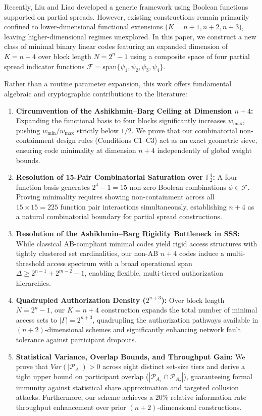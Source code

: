 \documentclass[pdflatex,sn-mathphys-num]{sn-jnl}%
\theoremstyle{thmstyleone}%
\theoremstyle{thmstyletwo}%
\theoremstyle{thmstylethree}%
\begin{document}
Recently, Liu and Liao \cite{LiuLiao2022} developed a generic framework using Boolean functions supported on partial spreads. However, existing constructions remain primarily confined to lower-dimensional functional extensions ($K = n+1, n+2, n+3$), leaving higher-dimensional regimes unexplored. In this paper, we construct a new class of minimal binary linear codes featuring an expanded dimension of $K = n + 4$ over block length $N = 2^n - 1$ using a composite space of four partial spread indicator functions $\mathcal{F} = \text{span}\{\psi_1, \psi_2, \psi_3, \psi_4\}$.

Rather than a routine parameter expansion, this work offers fundamental algebraic and cryptographic contributions to the literature:

\begin{enumerate}
    \item \textbf{Circumvention of the Ashikhmin--Barg Ceiling at Dimension $n+4$:} Expanding the functional basis to four blocks significantly increases $w_{\max}$, pushing $w_{\min}/w_{\max}$ strictly below $1/2$. We prove that our combinatorial non-containment design rules (Conditions C1--C3) act as an exact geometric sieve, ensuring code minimality at dimension $n+4$ independently of global weight bounds.

    \item \textbf{Resolution of 15-Pair Combinatorial Saturation over $\mathbb{F}_2^4$:} A four-function basis generates $2^4 - 1 = 15$ non-zero Boolean combinations $\phi \in \mathcal{F}$. Proving minimality requires showing non-containment across all $15 \times 15 = 225$ function pair interactions simultaneously, establishing $n + 4$ as a natural combinatorial boundary for partial spread constructions.

    \item \textbf{Resolution of the Ashikhmin--Barg Rigidity Bottleneck in SSS:} While classical AB-compliant minimal codes yield rigid access structures with tightly clustered set cardinalities, our non-AB $n+4$ codes induce a multi-threshold access spectrum with a broad operational span $\Delta \ge 2^{n-1} + 2^{m-2} - 1$, enabling flexible, multi-tiered authorization hierarchies.

    \item \textbf{Quadrupled Authorization Density ($2^{n+3}$):} Over block length $N = 2^n - 1$, our $K = n+4$ construction expands the total number of minimal access sets to $|\Gamma| = 2^{n+3}$, quadrupling the authorization pathways available in $(n+2)$-dimensional schemes \cite{LiuLiao2022} and significantly enhancing network fault tolerance against participant dropouts.

    \item \textbf{Statistical Variance, Overlap Bounds, and Throughput Gain:} We prove that $Var(|\mathcal{P}_A|) > 0$ across eight distinct set-size tiers and derive a tight upper bound on participant overlap ($|\mathcal{P}_{A_1} \cap \mathcal{P}_{A_2}|$), guaranteeing formal immunity against statistical share approximation and targeted collusion attacks. Furthermore, our scheme achieves a $20\%$ relative information rate throughput enhancement over prior $(n+2)$-dimensional constructions.
\end{enumerate}
\end{document}
